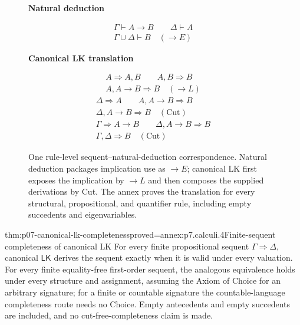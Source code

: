 \begin{figure}[!htbp]
\centering
\begin{minipage}[t]{.43\textwidth}
\centering\small
\textbf{Natural deduction}\par\medskip
\[
 \begin{array}{c}
 \Gamma\vdash A\to B\qquad\Delta\vdash A\\[-2pt]
 \hline
 \Gamma\cup\Delta\vdash B\quad(\to E)
 \end{array}
\]
\end{minipage}
\hfill
\begin{minipage}[t]{.53\textwidth}
\centering\small
\textbf{Canonical LK translation}\par\medskip
\[
 \begin{array}{c}
 A\Rightarrow A,B\qquad A,B\Rightarrow B\\[-2pt]
 \hline
 A,A\to B\Rightarrow B\quad(\to L)
 \end{array}
\]
\[
 \begin{array}{c}
 \Delta\Rightarrow A\qquad A,A\to B\Rightarrow B\\[-2pt]
 \hline
 \Delta,A\to B\Rightarrow B\quad(\mathrm{Cut})\\[3pt]
 \Gamma\Rightarrow A\to B\qquad
 \Delta,A\to B\Rightarrow B\\[-2pt]
 \hline
 \Gamma,\Delta\Rightarrow B\quad(\mathrm{Cut})
 \end{array}
\]
\end{minipage}
\caption{One rule-level sequent--natural-deduction correspondence.  Natural
deduction packages implication use as \(\to E\); canonical LK first exposes
the implication by \(\to L\) and then composes the supplied derivations by
Cut.  The annex proves the translation for every structural, propositional,
and quantifier rule, including empty succedents and eigenvariables.}
\label{fig:p07-sequent-nd-correspondence}
\end{figure}

\begin{hbtheorem}{thm:p07-canonical-lk-completeness}{proved=annex:p7.calculi.4}{Finite-sequent completeness of canonical LK}
For every finite propositional sequent \(\Gamma\Rightarrow\Delta\), canonical
\(\mathsf{LK}\) derives the sequent exactly when it is valid under every
valuation.  For every finite equality-free first-order sequent, the analogous
equivalence holds under every structure and assignment, assuming the Axiom of
Choice for an arbitrary signature; for a finite or countable signature the
countable-language completeness route needs no Choice.  Empty antecedents and
empty succedents are included, and no cut-free-completeness claim is made.
\end{hbtheorem}

